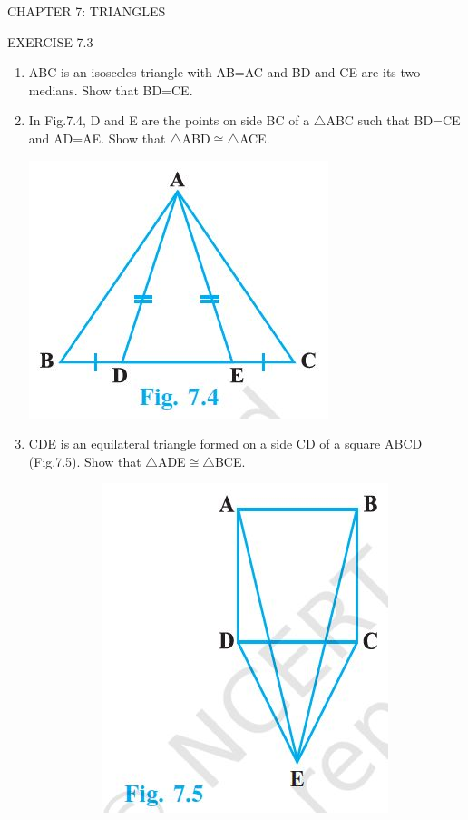 \documentclass{article}
\begin{document}
\begin{center}
	\color{blue} CHAPTER 7: TRIANGLES
\end{center}
\begin{center}
	\color{blue} EXERCISE 7.3
\end{center}

\begin{enumerate}
\item ABC is an isosceles triangle with AB=AC and BD and CE are its two medians. Show that BD=CE.
\item In Fig.7.4, D and E are the points on side BC of a $\triangle$ABC such that BD=CE and AD=AE. Show that $\triangle$ABD$\cong$$\triangle$ACE.
	\begin{center}
		\includegraphics[scale=0.5]{Figure1}
	\end{center}
\item CDE is an equilateral triangle formed on a side CD of a square ABCD (Fig.7.5). Show that $\triangle$ADE$\cong$$\triangle$BCE.
\begin{figure}[h]
	\begin{subfigure}{0.5\textwidth}
		\includegraphics[scale=0.5]{Figure2}

\end{subfigure}
\end{figure}
\end{enumerate}
\end{document}
